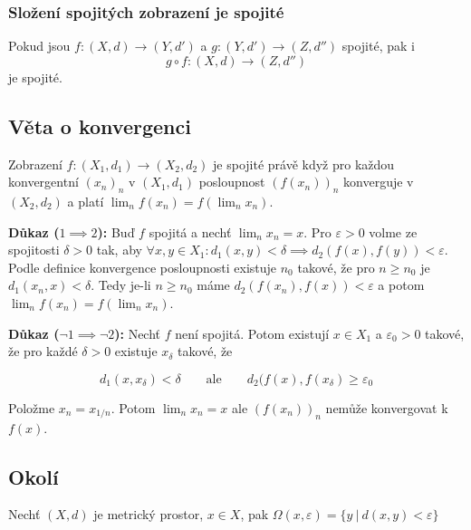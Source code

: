 \documentclass[../main.tex]{subfiles}
\begin{document}
\subsubsection{Složení spojitých zobrazení je spojité}

\hspace{1.2mm}
Pokud jsou $f: (X,d) \to (Y, d')$ a $g: (Y,d') \to (Z, d'')$ spojité, pak i
\[ g \circ f: (X,d) \to (Z,d'') \] je spojité.

\subsection{Věta o konvergenci}
\hspace{1.2mm}
Zobrazení $f: (X_1,d_1) \rightarrow (X_2,d_2)$ je spojité právě když pro každou konvergentní $(x_n)_n$ v $(X_1,d_1)$ 
posloupnost $(f(x_n))_n$ konverguje v $(X_2,d_2)$ a platí $\lim_n f(x_n) = f(\lim_n x_n)$.

\noindent
\hspace{1.2mm}
\textbf{Důkaz ($1\implies2$):}
Buď $f$ spojitá a nechť $\lim_nx_n = x$. Pro $\varepsilon > 0$ volme ze spojitosti $\delta > 0$
tak, aby $\forall x,y \in X_1 : d_1(x,y) <\delta \implies d_2(f(x),f(y)) <\varepsilon$.
Podle definice konvergence posloupnosti existuje $n_0$ takové, že pro $n \ge n_0$ je $d_1(x_n,x) < \delta$. Tedy je-li $n \ge n_0$
máme $d_2(f(x_n),f(x)) < \varepsilon$ a potom $\lim_n f(x_n) = f(\lim_n x_n)$.

\noindent
\hspace{1.2mm}
\textbf{Důkaz ($\lnot 1 \implies \lnot 2$):} Nechť $f$ není spojitá.
Potom existují $x \in X_1$ a $\varepsilon_0 > 0$ takové, že pro každé $\delta > 0$ existuje $x_\delta$ takové, že

$$d_1(x, x_\delta) < \delta \qquad \text{ale} \qquad d_2(f(x), f(x_\delta) \ge \varepsilon_0$$

Položme $x_n = x_{1/n}$. Potom $\lim_n x_n = x$ ale $(f(x_n))_n$ nemůže konvergovat k $f(x)$.


\subsection{Okolí}
\hspace{1.2mm}
Nechť $(X,d)$ je metrický prostor, $x\in X$, pak
$\Omega (x,\varepsilon) = \{ y\ |\ d(x,y) < \varepsilon \}$
\end{document}
